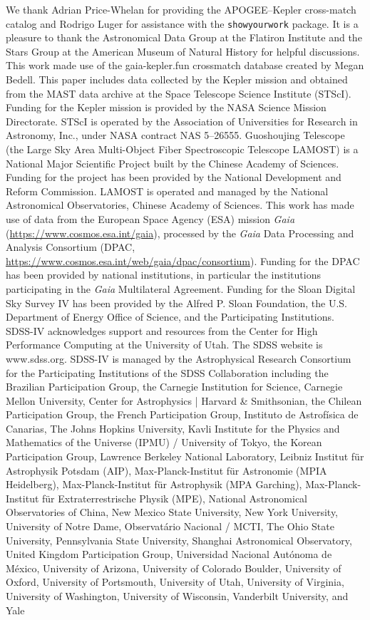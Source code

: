 \documentclass[linenumbers,tighten,trackchanges,twocolumn]{aastex631}
\begin{document}
\begin{acknowledgments}
We thank Adrian Price-Whelan for providing the APOGEE--Kepler cross-match catalog and Rodrigo Luger for assistance with the \texttt{showyourwork} package. It is a pleasure to thank the Astronomical Data Group at the Flatiron Institute and the Stars Group at the American Museum of Natural History for helpful discussions. This work made use of the gaia-kepler.fun crossmatch database created by Megan Bedell. This paper includes data collected by the Kepler mission and obtained from the MAST data archive at the Space Telescope Science Institute (STScI). Funding for the Kepler mission is provided by the NASA Science Mission Directorate. STScI is operated by the Association of Universities for Research in Astronomy, Inc., under NASA contract NAS 5–26555. Guoshoujing Telescope (the Large Sky Area Multi-Object Fiber Spectroscopic Telescope LAMOST) is a National Major Scientific Project built by the Chinese Academy of Sciences. Funding for the project has been provided by the National Development and Reform Commission. LAMOST is operated and managed by the National Astronomical Observatories, Chinese Academy of Sciences. This work has made use of data from the European Space Agency (ESA) mission {\it Gaia} (\url{https://www.cosmos.esa.int/gaia}), processed by the {\it Gaia} Data Processing and Analysis Consortium (DPAC, \url{https://www.cosmos.esa.int/web/gaia/dpac/consortium}). Funding for the DPAC has been provided by national institutions, in particular the institutions participating in the {\it Gaia} Multilateral Agreement. Funding for the Sloan Digital Sky Survey IV has been provided by the Alfred P. Sloan Foundation, the U.S. Department of Energy Office of Science, and the Participating Institutions. SDSS-IV acknowledges support and resources from the Center for High Performance Computing  at the University of Utah. The SDSS website is www.sdss.org. SDSS-IV is managed by the Astrophysical Research Consortium for the Participating Institutions of the SDSS Collaboration including the Brazilian Participation Group, the Carnegie Institution for Science, Carnegie Mellon University, Center for Astrophysics | Harvard \& Smithsonian, the Chilean Participation Group, the French Participation Group, Instituto de Astrof\'isica de Canarias, The Johns Hopkins University, Kavli Institute for the Physics and Mathematics of the Universe (IPMU) / University of Tokyo, the Korean Participation Group, Lawrence Berkeley National Laboratory, Leibniz Institut f\"ur Astrophysik Potsdam (AIP),  Max-Planck-Institut f\"ur Astronomie (MPIA Heidelberg), Max-Planck-Institut f\"ur Astrophysik (MPA Garching), Max-Planck-Institut f\"ur Extraterrestrische Physik (MPE), National Astronomical Observatories of China, New Mexico State University, New York University, University of Notre Dame, Observat\'ario Nacional / MCTI, The Ohio State University, Pennsylvania State University, Shanghai Astronomical Observatory, United Kingdom Participation Group, Universidad Nacional Aut\'onoma de M\'exico, University of Arizona, University of Colorado Boulder, University of Oxford, University of Portsmouth, University of Utah, University of Virginia, University of Washington, University of Wisconsin, Vanderbilt University, and Yale 
\end{acknowledgments}
\end{document}
